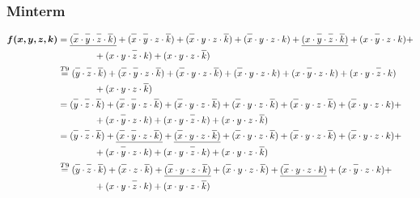 \documentclass{article}
\newcommand*{\oline}[1]{\overline{#1\mathstrut}}
\newcommand{\bigspace}{\quad\quad\quad\quad}
\begin{document}
\subsubsection*{Minterm}
\begin{align*}
  \bm{f(x,y,z,k)} &= \underline{(\oline{x} \cdot \oline{y} \cdot \oline{z} \cdot \oline{k})} + (\oline{x} \cdot \oline{y} \cdot z \cdot \oline{k}) + (\oline{x} \cdot y \cdot z \cdot \oline{k}) + (\oline{x} \cdot y \cdot z \cdot k) + \underline{(x \cdot \oline{y} \cdot \oline{z} \cdot \oline{k})} + (x \cdot \oline{y} \cdot z \cdot k) + \\
  &\bigspace + (x \cdot y \cdot \oline{z} \cdot k) + (x \cdot y \cdot z \cdot \oline{k})\\
  &\overset{T9}{=} (\oline{y} \cdot \oline{z} \cdot \oline{k}) + (\oline{x} \cdot \oline{y} \cdot z \cdot \oline{k}) + (\oline{x} \cdot y \cdot z \cdot \oline{k}) + (\oline{x} \cdot y \cdot z \cdot k) + (x \cdot \oline{y} \cdot z \cdot k) + (x \cdot y \cdot \oline{z} \cdot k)\\
  &\bigspace + (x \cdot y \cdot z \cdot \oline{k})\\
  &= (\oline{y} \cdot \oline{z} \cdot \oline{k}) + (\oline{x} \cdot \oline{y} \cdot z \cdot \oline{k}) + (\oline{x} \cdot y \cdot z \cdot \oline{k}) + (\oline{x} \cdot y \cdot z \cdot \oline{k}) + (\oline{x} \cdot y \cdot z \cdot \oline{k}) + (\oline{x} \cdot y \cdot z \cdot k) + \\
  &\bigspace + (x \cdot \oline{y} \cdot z \cdot k) + (x \cdot y \cdot \oline{z} \cdot k) + (x \cdot y \cdot z \cdot \oline{k})\\
  &= (\oline{y} \cdot \oline{z} \cdot \oline{k}) + \underline{(\oline{x} \cdot \oline{y} \cdot z \cdot \oline{k})} + \underline{(\oline{x} \cdot y \cdot z \cdot \oline{k})} + (\oline{x} \cdot y \cdot z \cdot \oline{k}) + (\oline{x} \cdot y \cdot z \cdot \oline{k}) + (\oline{x} \cdot y \cdot z \cdot k) + \\
  &\bigspace + (x \cdot \oline{y} \cdot z \cdot k) + (x \cdot y \cdot \oline{z} \cdot k) + (x \cdot y \cdot z \cdot \oline{k})\\
  &\overset{T9}{=} (\oline{y} \cdot \oline{z} \cdot \oline{k}) + (\oline{x} \cdot z \cdot \oline{k}) + \underline{(\oline{x} \cdot y \cdot z \cdot \oline{k})} + (\oline{x} \cdot y \cdot z \cdot \oline{k}) + \underline{(\oline{x} \cdot y \cdot z \cdot k)} + (x \cdot \oline{y} \cdot z \cdot k) + \\
  &\bigspace + (x \cdot y \cdot \oline{z} \cdot k) + (x \cdot y \cdot z \cdot \oline{k})\\

\end{align*}
\end{document}
